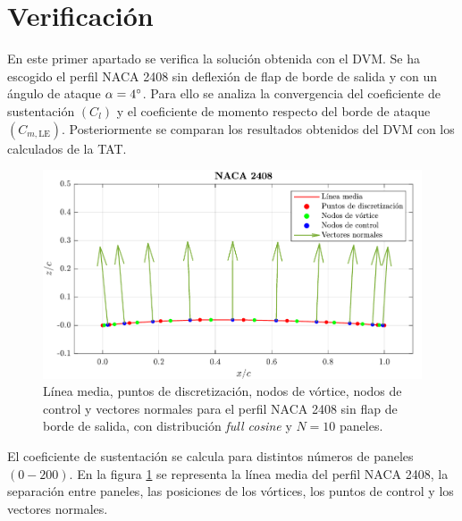 
\section{Verificación}

En este primer apartado se verifica la solución obtenida con el DVM. Se ha escogido el perfil NACA 2408 sin deflexión de flap de borde de salida y con un ángulo de ataque $\alpha = 4  \mathrm{^{\circ}}$. Para ello se analiza la convergencia del coeficiente de sustentación $\left( C_{l} \right)$ y el coeficiente de momento respecto del borde de ataque $\left( C_{m,\text{LE}} \right)$. Posteriormente se comparan los resultados obtenidos del DVM con los calculados de la TAT.

\begin{figure}[h]
    \centering
    \includegraphics[width=\linewidth]{imagenes/verificacion/verificacion_perfil.pdf}
    \caption{Línea media, puntos de discretización, nodos de vórtice, nodos de control y vectores normales para el perfil NACA 2408 sin flap de borde de salida, con distribución \emph{full cosine} y $N = 10$ paneles.}
    \label{fig:verificacion_perfil}
\end{figure}

El coeficiente de sustentación se calcula para distintos números de paneles $\left( 0 - 200 \right)$. En la figura \ref{fig:verificacion_perfil} se representa la línea media del perfil NACA 2408, la separación entre paneles, las posiciones de los vórtices, los puntos de control y los vectores normales.


